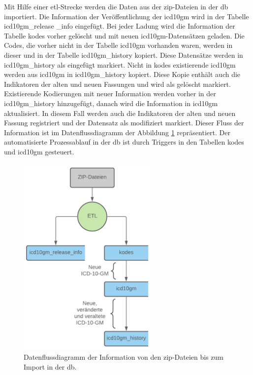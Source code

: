 Mit Hilfe einer \ac{etl}-Strecke werden die Daten aus der \ac{zip}-Dateien in der \ac{db} importiert. Die Information der Veröffentlichung der \ac{icd10gm} wird in der Tabelle \textsf{icd10gm\_release \_info} eingefügt. Bei jeder Ladung wird die Information der Tabelle \textsf{kodes} vorher gelöscht und mit neuen \ac{icd10gm}-Datensätzen geladen. Die Codes, die vorher nicht in der Tabelle \textsf{icd10gm} vorhanden waren, werden in dieser und in der Tabelle \textsf{icd10gm\_history} kopiert. Diese Datensätze werden in \textsf{icd10gm\_history} als eingefügt markiert. Nicht in \textsf{kodes} existierende \ac{icd10gm} werden aus \textsf{icd10gm} in \textsf{icd10gm\_history} kopiert. Diese Kopie enthält auch die Indikatoren der alten und neuen Fassungen und wird als gelöscht markiert. Existierende Kodierungen mit neuer Information werden vorher in der \textsf{icd10gm\_history} hinzugefügt, danach wird die Information in \textsf{icd10gm} aktualisiert. In diesem Fall werden auch die Indikatoren der alten und neuen Fassung registriert und der Datensatz als modifiziert markiert. Dieser Fluss der Information ist im Datenflussdiagramm der Abbildung \ref{fig:dbflow} repräsentiert. Der automatisierte Prozessablauf in der \ac{db} ist durch Triggers in den Tabellen \textsf{kodes} und \textsf{icd10gm} gesteuert.

\begin{figure}[ht]
	\centering
	\includegraphics[height=10cm]{figures/dbflow}
	\caption[Datenfluss des Prozesses]{Datenflussdiagramm der Information von den \ac{zip}-Dateien bis zum Import in der \ac{db}.}
	\label{fig:dbflow}
\end{figure} 
